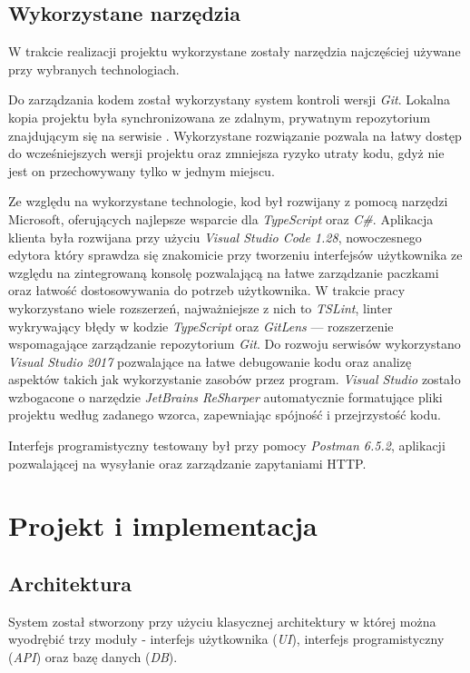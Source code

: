 \documentclass[eng,printmode,openany]{mgr}
\begin{document}
\section{Wykorzystane narzędzia}
W trakcie realizacji projektu wykorzystane zostały narzędzia najczęściej używane przy wybranych technologiach.

Do zarządzania kodem został wykorzystany system kontroli wersji \textit{Git}. Lokalna kopia projektu była synchronizowana ze zdalnym, prywatnym repozytorium znajdującym się na serwisie . Wykorzystane rozwiązanie pozwala na łatwy dostęp do wcześniejszych wersji projektu oraz zmniejsza ryzyko utraty kodu, gdyż nie jest on przechowywany tylko w jednym miejscu.

Ze względu na wykorzystane technologie, kod był rozwijany z pomocą narzędzi Microsoft, oferujących najlepsze wsparcie dla \textit{TypeScript} oraz \textit{C\#}. Aplikacja klienta była rozwijana przy użyciu \textit{Visual Studio Code 1.28}, nowoczesnego edytora który sprawdza się znakomicie przy tworzeniu interfejsów użytkownika ze względu na zintegrowaną konsolę pozwalającą na łatwe zarządzanie paczkami oraz łatwość dostosowywania do potrzeb użytkownika. W trakcie pracy wykorzystano wiele rozszerzeń, najważniejsze z nich to \textit{TSLint}, linter wykrywający błędy w kodzie \textit{TypeScript} oraz \textit{GitLens} — rozszerzenie wspomagające zarządzanie repozytorium \textit{Git}. Do rozwoju serwisów wykorzystano \textit{Visual Studio 2017} pozwalające na łatwe debugowanie kodu oraz analizę aspektów takich jak wykorzystanie zasobów przez program. \textit{Visual Studio} zostało wzbogacone o narzędzie \textit{JetBrains ReSharper} automatycznie formatujące pliki projektu według zadanego wzorca, zapewniając spójność i przejrzystość kodu.

Interfejs programistyczny testowany był przy pomocy \textit{Postman 6.5.2}, aplikacji pozwalającej na wysyłanie oraz zarządzanie zapytaniami HTTP.

\newpage
\chapter{Projekt i implementacja}
\section{Architektura}
System został stworzony przy użyciu klasycznej architektury w której można wyodrębić trzy moduły - interfejs użytkownika (\textit{UI}), interfejs programistyczny (\textit{API}) oraz bazę danych (\textit{DB}). 
\end{document}
